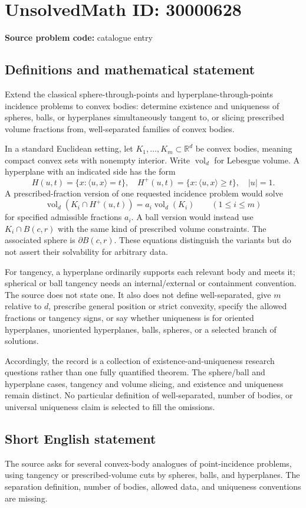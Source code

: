 \documentclass[11pt]{article}
\newcommand{\R}{\mathbb{R}}
\begin{document}
\section*{UnsolvedMath ID: 30000628}
\textbf{Source problem code:} catalogue entry
\subsection{Definitions and mathematical statement}
Extend the classical sphere-through-points and hyperplane-through-points incidence problems to convex bodies: determine existence and uniqueness of spheres, balls, or hyperplanes simultaneously tangent to, or slicing prescribed volume fractions from, well-separated families of convex bodies.

In a standard Euclidean setting, let $K_1,\ldots,K_m\subset\R^d$ be convex bodies, meaning compact convex sets with nonempty interior. Write $\operatorname{vol}_d$ for Lebesgue volume. A hyperplane with an indicated side has the form
\[
 H(u,t)=\{x:\langle u,x\rangle=t\},\quad
 H^+(u,t)=\{x:\langle u,x\rangle\ge t\},\quad |u|=1.
\]
A prescribed-fraction version of one requested incidence problem would solve
\[
 \operatorname{vol}_d(K_i\cap H^+(u,t))
       =a_i\operatorname{vol}_d(K_i)\qquad(1\le i\le m)
\]
for specified admissible fractions $a_i$. A ball version would instead use $K_i\cap B(c,r)$ with the same kind of prescribed volume constraints. The associated sphere is $\partial B(c,r)$. These equations distinguish the variants but do not assert their solvability for arbitrary data.

For tangency, a hyperplane ordinarily supports each relevant body and meets it; spherical or ball tangency needs an internal/external or containment convention. The source does not state one. It also does not define well-separated, give $m$ relative to $d$, prescribe general position or strict convexity, specify the allowed fractions or tangency signs, or say whether uniqueness is for oriented hyperplanes, unoriented hyperplanes, balls, spheres, or a selected branch of solutions.

Accordingly, the record is a collection of existence-and-uniqueness research questions rather than one fully quantified theorem. The sphere/ball and hyperplane cases, tangency and volume slicing, and existence and uniqueness remain distinct. No particular definition of well-separated, number of bodies, or universal uniqueness claim is selected to fill the omissions.
\subsection{Short English statement}
The source asks for several convex-body analogues of point-incidence problems, using tangency or prescribed-volume cuts by spheres, balls, and hyperplanes. The separation definition, number of bodies, allowed data, and uniqueness conventions are missing.
\end{document}
